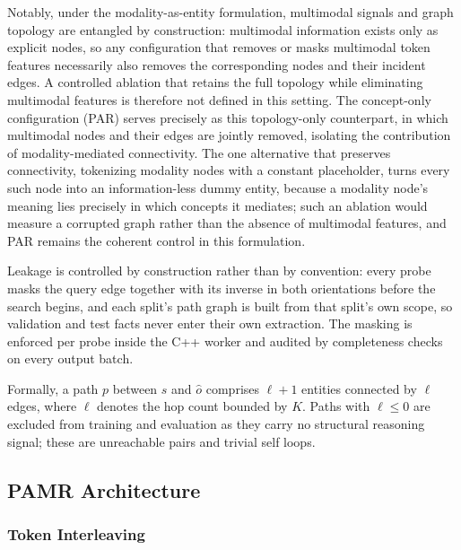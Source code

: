 \documentclass[runningheads]{llncs}
\begin{document}
Notably, under the modality-as-entity formulation, multimodal signals and
graph topology are entangled by construction: multimodal information exists
only as explicit nodes, so any configuration that removes or masks multimodal
token features necessarily also removes the corresponding nodes and their
incident edges. A controlled ablation that retains the full topology while
eliminating multimodal features is therefore not defined in this setting.
The concept-only configuration (PAR) serves precisely as this topology-only
counterpart, in which multimodal nodes and their edges are jointly removed,
isolating the contribution of modality-mediated connectivity. The one
alternative that preserves connectivity, tokenizing modality nodes with a
constant placeholder, turns every such node into an information-less dummy
entity, because a modality node's meaning lies precisely in which concepts
it mediates; such an ablation would measure a corrupted graph rather than
the absence of multimodal features, and PAR remains the coherent control
in this formulation.

Leakage is controlled by construction rather than by convention:
every probe masks the query edge together with its inverse in both
orientations before the search begins, and each split's path graph is
built from that split's own scope, so validation and test facts never
enter their own extraction. The masking is enforced per probe inside
the C++ worker and audited by completeness checks on every output
batch.

Formally, a path $p$ between $s$ and $\hat{o}$ comprises $\ell + 1$
entities connected by $\ell$ edges, where
$\ell$ denotes the hop count bounded by $K$.
Paths with $\ell \leq 0$ are excluded from training and evaluation as they
carry no structural reasoning signal; these are unreachable pairs and
trivial self loops.

\subsection{PAMR Architecture}
\label{sec:pamr-architecture}

\subsubsection{Token Interleaving}
\label{sec:token-interleaving}
\end{document}
